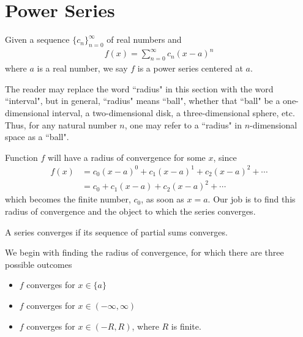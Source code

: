 \section{Power Series}

\begin{definition}
Given a sequence $\{c_{n}\}_{n=0}^{\infty}$ of real numbers and
\begin{align*}
    f(x) = \sum_{n=0}^{\infty} c_{n} (x - a)^{n}
\end{align*}
where $a$ is a real number, we say $f$ is a power series centered at $a$.
\end{definition}

\begin{note}
The reader may replace the word ``radius" in this section with the word ``interval", but in general, ``radius" means ``ball", whether that ``ball" be a one-dimensional interval, a two-dimensional disk, a three-dimensional sphere, etc. Thus, for any natural number $n$, one may refer to a ``radius" in $n$-dimensional space as a ``ball".
\end{note}

Function $f$ will have a radius of convergence for some $x$, since
\begin{align*}
    f(x) &= c_{0} (x - a)^{0} + c_{1} (x - a)^{1} + c_{2} (x - a)^{2} + \cdots\\[2ex]
    &= c_{0} + c_{1} (x - a) + c_{2} (x - a)^{2} + \cdots
\end{align*}
which becomes the finite number, $c_{0}$, as soon as $x = a$. Our job is to find this radius of convergence and the object to which the series converges. 

\begin{note}
A series converges if its sequence of partial sums converges.
\end{note}

We begin with finding the radius of convergence, for which there are three possible outcomes
\begin{itemize}
    \item $f$ converges for $x \in \{a\}$
    \item $f$ converges for $x \in (-\infty, \infty)$
    \item $f$ converges for $x \in (-R, R)$, where $R$ is finite. 
\end{itemize}

